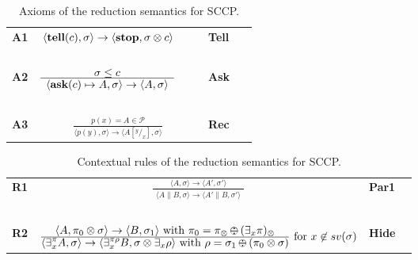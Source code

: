 \documentclass{llncs}
\newcommand{\tell}{{\bf tell}}
\newcommand{\ask}{{\bf ask}}
\newcommand{\ostop}{{\bf stop}}
\def\odiv{\, {\ominus\hspace{-7.7pt} \div} \,}
\begin{document}
\begin{table}[t]  %
   \begin{center}
   \begin{tabular}{lcll} 
   \mbox{\bf A1}& $ {\displaystyle \langle \hbox{\tell}(c), \sigma \rangle \to \langle 
   \hbox{\ostop}, \sigma \otimes c\rangle}$
   \ \ \ & \bf{Tell}&
  \\ 
  &\mbox{   }&\mbox{   } &\mbox{   }
  \\
  \mbox{\bf A2}& $\frac {\displaystyle \sigma \leq c}{\displaystyle
  	\begin{array}{l} \langle \hbox{\ask}(c) \mapsto A, \sigma \rangle \to \langle A, \sigma \rangle   	\end{array}}$
    \ \ \ & \bf{Ask}&
    \\
    &\mbox{   }&\mbox{   }&
    \\
  \mbox{\bf A3}& $\frac {\displaystyle p(x) = A \in \mathcal{P} }
  {\displaystyle\langle p(y),\sigma\rangle \to \langle A[^y/_x], \sigma \rangle}$ 
  &\bf{Rec}&
  \end{tabular}
  \end{center}
\caption{Axioms of the reduction semantics for SCCP.}
\label{fig:operational}
\end{table}

\begin{table}  %
   \begin{center}
   \begin{tabular}{lcll} 
  \mbox{\bf R1}& $\frac {\displaystyle \langle A, \sigma\rangle \to \langle A', \sigma' \rangle} 
  {\displaystyle \begin{array}{l}
                          \langle A\parallel B, \sigma \rangle \to \langle A'\parallel B, \sigma' \rangle
                          \end{array}}$ 
    & \bf{Par1}&
  \\
  & \mbox{   }&\mbox{   }&
  \\
    \mbox{\bf R2}& $\frac {\displaystyle \langle A, \pi_0 \otimes \sigma \rangle
    \to \langle B, \sigma_1 \rangle \text{ with } \pi_0 = \pi_\otimes \odiv (\exists_x \pi)_\otimes}
    {\displaystyle\langle \exists^{\pi}_x A,\sigma\rangle \to \langle 
    \exists^{\pi \rho}_x B, \sigma \otimes \exists_x \rho
    \rangle \text{ with } \rho = \sigma_1 \odiv (\pi_0 \otimes \sigma)} \text{ for } x \not \in sv(\sigma)$
    &\bf{Hide}&
  \end{tabular}
  \end{center}
\caption{Contextual rules of the reduction semantics for SCCP.}
\label{fig:operational2}
\end{table}
\end{document}
